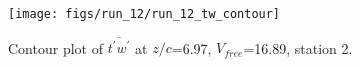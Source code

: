 \begin{figure}[H]
\centering
\texttt{[image: figs/run\_12/run\_12\_tw\_contour]}
\caption{Contour plot of $\overline{t^\prime w^\prime}$ at $z/c$=6.97, $V_{free}$=16.89, station 2.}
\label{fig:run_12_tw_contour}
\end{figure}


